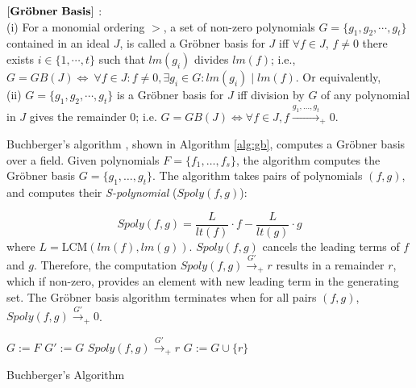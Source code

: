\begin{definition}
\label{def:gb}
$\bf{\left[Gr\ddot{o}bner\ Basis\right]}$ \cite{gb_book}:\\
(i) For a monomial ordering $>$, a set  of non-zero polynomials $G =
\{g_1,g_2,\cdots,g_t\}$ contained in an ideal $J$, is called a
Gr\"{o}bner basis for $J$ iff $\forall f \in J$, $f\neq 0$ there
exists $i \in \{1,\cdots, t\}$ such that $lm(g_i)$ divides $lm(f)$;
i.e., $G = GB(J) \Leftrightarrow\  \forall f \in J : f \neq 0, \exists
g_i \in G : lm(g_i)\mid lm(f)$. Or equivalently, \\
(ii) $G = \{g_1,g_2,\cdots,g_t\}$ is a Gr\"{o}bner basis for $J$ iff
division by $G$ of any polynomial in $J$ gives the remainder 0;
i.e. $G = GB(J) \iff \forall f \in J, f\xrightarrow{g_1,\dots,g_t}_+ 0$.
\end{definition}

Buchberger's algorithm 
\cite{buchberger_thesis},
shown in Algorithm \ref{alg:gb},  computes a Gr\"obner
basis over a field. Given polynomials $F = \{f_1, \dots, f_s\}$, 
the algorithm computes the Gr\"obner basis $G = \{g_1, \dots, 
g_t\}$. 
The algorithm takes pairs of polynomials $(f, g)$, and computes their
{\it S-polynomial} ($Spoly(f, g)$): 

\begin{equation}
       Spoly(f,g)=\frac{L}{lt(f)}\cdot f - \frac{L}{lt(g)}\cdot g \nonumber
      \label{eqn:spoly}
\end{equation}
where $L = \text{LCM}(lm(f), lm(g))$. 
$Spoly(f,g)$ cancels the leading terms of $f$ and $g$. Therefore, the 
computation $Spoly(f,g) \xrightarrow{G'}_+r$ results in a remainder $r$,
which if non-zero, provides an element with new leading term in the
generating set.  The Gr\"obner basis algorithm terminates when for all pairs
$(f, g)$, $Spoly(f,g)\xrightarrow{G'}_+0$. 

\begin{algorithm}[hbt]
\SetAlgoNoLine
  $G:= F$\;
  {
        $G' := G$\;
        {
                $Spoly(f, g) \stackrel{G'}{\textstyle\longrightarrow}_+r$ \;
                {
                        $G:= G \cup \{r\}$ \;
                }
        }
   }
\caption {Buchberger's Algorithm}\label{alg:gb}
\end{algorithm}

